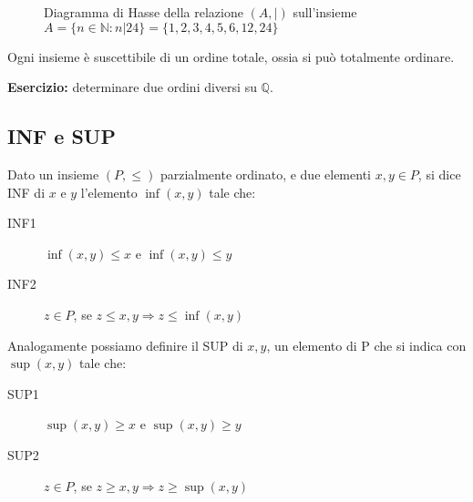 \begin{figure}[ht]
\centering
{}
\caption{Diagramma di Hasse della relazione $(A,|)$ sull'insieme $A = \{n \in \mathbb{N} : n | 24\} = \{ 1, 2, 3, 4, 5, 6, 12, 24 \} $}
\end{figure}

\begin{theorem}
Ogni insieme \`e suscettibile di un ordine totale, ossia si pu\`o totalmente ordinare.
\end{theorem}

\textbf{Esercizio:} determinare due ordini diversi su $\mathbb{Q}$.

\vspace{5cm}

\subsection{INF e SUP}

\begin{defn}[INF]
Dato un insieme $(P, \leq)$ parzialmente ordinato, e due elementi $x,y \in P$, si dice INF di $x$ e $y$ l'elemento $\inf(x,y)$ tale che:
\begin{description}
    \item[INF1\label{itm:inf1}] $\inf(x,y) \leq x $ e $ \inf(x,y) \leq y$
    \item[INF2\label{itm:inf2}] $z \in P$, se $ z \leq x, y \Rightarrow z \leq \inf(x,y)$
\end{description}
\end{defn}
\begin{defn}[SUP]
Analogamente possiamo definire il SUP di $x,y$, un elemento di P che si indica con $\sup(x,y)$ tale che:
\begin{description}
    \item[SUP1\label{itm:sup1}] $\sup(x,y) \geq x $ e $ \sup(x,y) \geq y$
    \item[SUP2\label{itm:sup2}] $z \in P$, se $ z \geq x, y \Rightarrow z \geq \sup(x,y)$
\end{description}
\end{defn}

